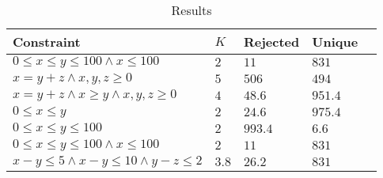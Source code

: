 \documentclass[sigconf,nonacm]{acmart}
\begin{document}
\begin{center}
\begin{table}[]
\caption{Results}
\label{tab:data}
\centering
\begin{tabular}{|l|l|l|l|l|}
\hline
Constraint & $K$ & Rejected & Unique \\ \hline
     $0 \leq x \leq y \leq 100 \wedge x \leq 100$ & $2$ & $11$ & $831$ \\ \hline
     $x = y + z \wedge x,y,z \geq 0$      &   $5$   &    $506$      &     $494$   \\ \hline
     $x = y + z \wedge x \geq y \wedge x,y,z \geq 0$      &   $4$  &    $48.6$      &    $951.4$    \\ \hline
     $0 \leq x \leq y $  &  $2$   &  $24.6$   &       $975.4$       \\ \hline
     $0 \leq x \leq y \leq 100$ & $2$ & $993.4$ & $6.6$ \\ \hline
     $0 \leq x \leq y \leq 100 \wedge x \leq 100$ & $2$ & $11$ & $831$ \\ \hline
     $x - y \leq 5 \wedge x - y \leq 10 \wedge y - z \leq 2$ & $3.8$ & $26.2$ & $831$ \\ \hline
\end{tabular}
\end{table}
\end{center}



\end{document}
